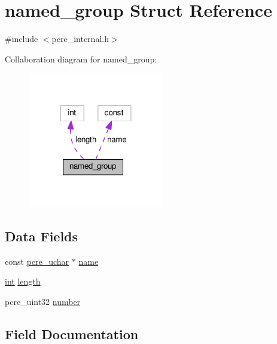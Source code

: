 \hypertarget{structnamed__group}{}\section{named\+\_\+group Struct Reference}
\label{structnamed__group}


{\ttfamily \#include $<$pcre\+\_\+internal.\+h$>$}



Collaboration diagram for named\+\_\+group\+:
\nopagebreak
\begin{figure}[H]
\begin{center}
\leavevmode
\includegraphics[width=168pt]{structnamed__group__coll__graph}
\end{center}
\end{figure}
\subsection*{Data Fields}
\begin{DoxyCompactItemize}
\item 
const \hyperlink{pcre__internal_8h_a9d8efd0ad5b191db2a1793268600deb9}{pcre\+\_\+uchar} $\ast$ \hyperlink{structnamed__group_ac5ed274a3d3679fece026efa17218163}{name}
\item 
\hyperlink{pcre_8txt_a42dfa4ff673c82d8efe7144098fbc198}{int} \hyperlink{structnamed__group_a1aa1208b3c81a320c85ab8cd3da21d50}{length}
\item 
pcre\+\_\+uint32 \hyperlink{structnamed__group_a08e3aa8190d8914811fcbfc6b3b7670f}{number}
\end{DoxyCompactItemize}


\subsection{Field Documentation}
